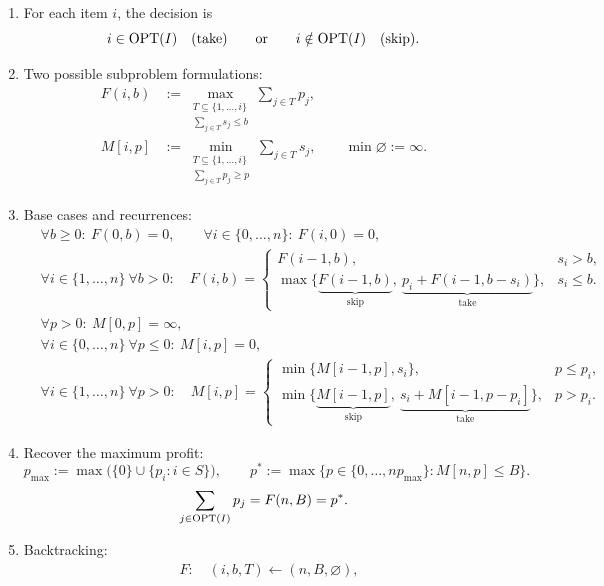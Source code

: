 \documentclass[12pt,a4paper]{article}
\begin{document}
\begin{definition}
\label{def:exact-knapsack-dp}
\leavevmode
\begin{enumerate}
\item For each item $i$, the decision is
\[
i\in\operatorname{OPT}(I)\quad\text{(take)}\qquad\text{or}\qquad
i\notin\operatorname{OPT}(I)\quad\text{(skip)}.
\]
\item Two possible subproblem formulations:
\[
\begin{aligned}
F(i,b)&:=\max_{\substack{T\subseteq\{1,\ldots,i\}\\\sum_{j\in T}s_j\leq b}}
\sum_{j\in T}p_j,\\[6pt]
M[i,p]&:=\min_{\substack{T\subseteq\{1,\ldots,i\}\\\sum_{j\in T}p_j\geq p}}
\sum_{j\in T}s_j,\qquad \min\varnothing:=\infty.
\end{aligned}
\]
\item Base cases and recurrences:
\[
\begin{aligned}
&\forall b\geq0:\ F(0,b)=0,\qquad
\forall i\in\{0,\ldots,n\}:\ F(i,0)=0,\\[3pt]
&\forall i\in\{1,\ldots,n\}\ \forall b>0:\quad
F(i,b)=
\begin{cases}
F(i-1,b),&s_i>b,\\[3pt]
\max\{\underbrace{F(i-1,b)}_{\text{skip}},\
\underbrace{p_i+F(i-1,b-s_i)}_{\text{take}}\},&s_i\leq b.
\end{cases}
\end{aligned}
\]
\[
\begin{aligned}
&\forall p>0:\ M[0,p]=\infty,\\[3pt]
&\forall i\in\{0,\ldots,n\}\ \forall p\leq0:\ M[i,p]=0,\\[3pt]
&\forall i\in\{1,\ldots,n\}\ \forall p>0:\quad
M[i,p]=
\begin{cases}
\min\{M[i-1,p],s_i\},&p\leq p_i,\\[3pt]
\min\{\underbrace{M[i-1,p]}_{\text{skip}},\
\underbrace{s_i+M[i-1,p-p_i]}_{\text{take}}\},&p>p_i.
\end{cases}
\end{aligned}
\]
\item Recover the maximum profit:
\[
p_{\max}:=\max\bigl(\{0\}\cup\{p_i:i\in S\}\bigr),\qquad
p^*:=\max\{p\in\{0,\ldots,np_{\max}\}:M[n,p]\leq B\}.
\]
\[
\sum_{j\in\operatorname{OPT}(I)}p_j
=F(n,B)=p^*.
\]
\item Backtracking:
\[
\begin{aligned}
&F:\quad(i,b,T)\leftarrow(n,B,\varnothing),\\[3pt]

\end{aligned}\]
\end{enumerate}
\end{definition}
\end{document}
